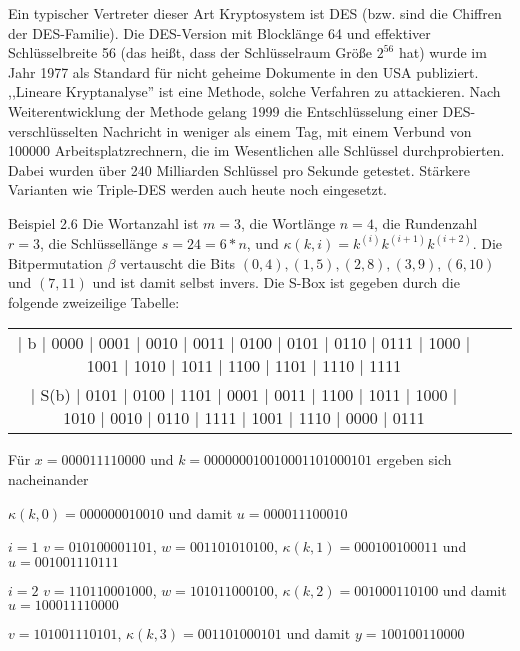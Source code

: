 \documentclass[a4paper]{article}
\begin{document}
\begin{multicols}{3}
    Ein typischer Vertreter dieser Art Kryptosystem ist DES (bzw. sind die Chiffren der DES-Familie). Die DES-Version mit Blocklänge 64 und effektiver Schlüsselbreite 56 (das heißt, dass der Schlüsselraum Größe $2^{56}$ hat) wurde im Jahr 1977 als Standard für nicht geheime Dokumente in den USA publiziert. ,,Lineare Kryptanalyse'' ist eine Methode, solche Verfahren zu attackieren. Nach Weiterentwicklung der Methode gelang 1999 die Entschlüsselung einer DES-verschlüsselten Nachricht in weniger als einem Tag, mit einem Verbund von 100000 Arbeitsplatzrechnern, die im Wesentlichen alle Schlüssel durchprobierten. Dabei wurden über 240 Milliarden Schlüssel pro Sekunde getestet. Stärkere Varianten wie Triple-DES werden auch heute noch eingesetzt.

    Beispiel 2.6 Die Wortanzahl ist $m=3$, die Wortlänge $n=4$, die Rundenzahl $r=3$, die Schlüssellänge $s=24=6*n$, und $\kappa (k,i)=k^{(i)}k^{(i+1)}k^{(i+2)}$. Die Bitpermutation $\beta$ vertauscht die Bits $(0,4),(1,5),(2,8),(3,9),(6,10)$ und $(7,11)$ und ist damit selbst invers. Die S-Box ist gegeben durch die folgende zweizeilige Tabelle:
    \begin{tabular}{c|c|c}
    | b  | 0000 | 0001 | 0010 | 0011 | 0100 | 0101 | 0110 | 0111 | 1000 | 1001 | 1010 | 1011 | 1100 | 1101 | 1110 | 1111 \\
    | S(b) | 0101 | 0100 | 1101 | 0001 | 0011 | 1100 | 1011 | 1000 | 1010 | 0010 | 0110 | 1111 | 1001 | 1110 | 0000 | 0111 
    \end{tabular}

    Für $x= 0000 1111 0000$ und $k=0000 0001 0010 0011 0100 0101$ ergeben sich nacheinander
    \begin{enumerate*}
        \item $\kappa (k,0) = 0000 0001 0010$ und damit $u= 0000 1110 0010$
        \item
        \begin{itemize*}
            \item $i=1$ $v=0101 0000 1101$, $w=0011 0101 0100$, $\kappa (k,1) = 0001 0010 0011$ und $u=0010 0111 0111$
            \item $i=2$ $v=1101 1000 1000$, $w=1010 1100 0100$, $\kappa (k,2) = 0010 0011 0100$ und damit $u= 1000 1111 0000$
        \end{itemize*}
        \item $v=1010 0111 0101$, $\kappa (k,3) = 0011 0100 0101$ und damit $y=1001 0011 0000$
    \end{enumerate*}



\end{multicols}
\end{document}
